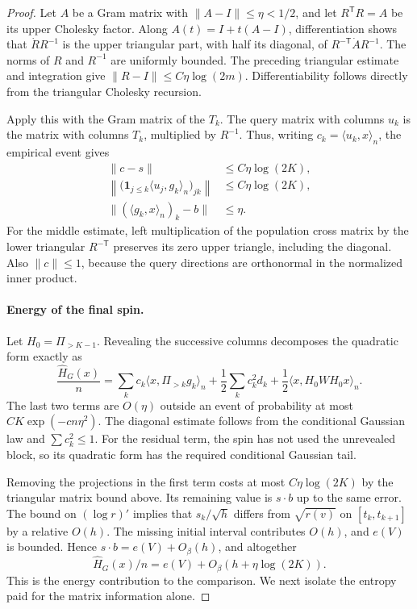 \begin{proof}
Let $A$ be a Gram matrix with $\|A-I\|\le\eta<1/2$, and let
$R^{\mathsf T}R=A$ be its upper Cholesky factor. Along
$A(t)=I+t(A-I)$, differentiation shows that
$\dot R R^{-1}$ is the upper triangular part, with half its diagonal,
of $R^{-\mathsf T}\dot A R^{-1}$. The norms of $R$ and $R^{-1}$
are uniformly bounded. The preceding triangular estimate and
integration give
$\|R-I\|\le C\eta\log(2m)$. Differentiability follows directly
from the triangular Cholesky recursion.

Apply this with the Gram matrix of the $T_k$. The query matrix with
columns $u_k$ is the matrix with columns $T_k$, multiplied by $R^{-1}$.
Thus, writing $c_k=\langle u_k,x\rangle_n$, the empirical event gives
\[
 \begin{aligned}
 \|c-s\|&\le C\eta\log(2K),\\
 \left\|\bigl(\mathbf1_{j\le k}\langle u_j,g_k\rangle_n\bigr)_{jk}
       \right\|&\le C\eta\log(2K),\\
 \| (\langle g_k,x\rangle_n)_k-b\|&\le\eta.
 \end{aligned}
\]
For the middle estimate, left multiplication of the population cross
matrix by the lower triangular $R^{-\mathsf T}$ preserves its zero
upper triangle, including the diagonal. Also $\|c\|\le1$, because
the query directions are orthonormal in the normalized inner product.

\paragraph{Energy of the final spin.}
Let $H_0=\Pi_{>K-1}$. Revealing the successive columns decomposes the
quadratic form exactly as
\[
 \frac{\widehat H_G(x)}n
 =\sum_kc_k\langle x,\Pi_{>k}g_k\rangle_n
  +\frac12\sum_kc_k^2d_k
  +\frac12\langle x,H_0WH_0x\rangle_n.
\]
The last two terms are $O(\eta)$ outside an event of probability at
most $CK\exp(-cn\eta^2)$. The diagonal estimate follows from the
conditional Gaussian law and $\sum c_k^2\le1$. For the residual
term, the spin has not used the unrevealed block, so its quadratic
form has the required conditional Gaussian tail.

Removing the projections in the first term costs at most
$C\eta\log(2K)$ by the triangular matrix bound above. Its remaining
value is $s\cdot b$ up to the same error. The bound on
$(\log r)'$ implies that $s_k/\sqrt h$ differs from
$\sqrt{r(v)}$ on $[t_k,t_{k+1}]$ by a relative $O(h)$.
The missing initial interval contributes $O(h)$, and $e(V)$ is
bounded. Hence $s\cdot b=e(V)+O_\beta(h)$, and altogether
\[
 \widehat H_G(x)/n=e(V)+O_\beta(h+\eta\log(2K)).
 \tag{7}\label{eq:7}
\]
This is the energy contribution to the comparison. We next isolate the
entropy paid for the matrix information alone.


\end{proof}

